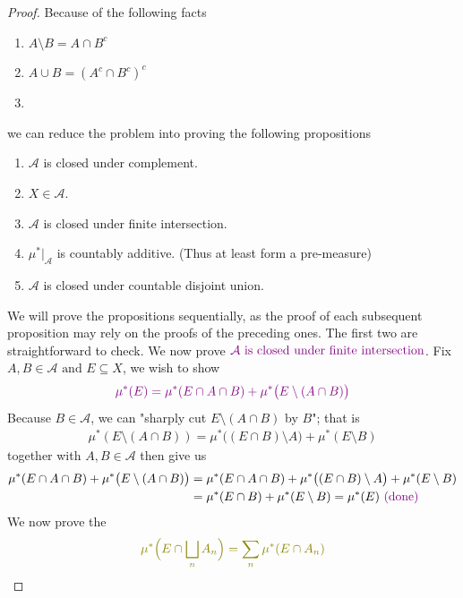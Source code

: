 \documentclass{report}
\begin{document}
\begin{proof}
Because of the following facts 
\begin{enumerate}[label=(\alph*)]
  \item $A\setminus B=A\cap B^c$
  \item $A\cup B=(A^c \cap B^c)^c$ 
  \item {}
\end{enumerate}
we can reduce the problem into proving the following propositions 
\begin{enumerate}[label=(\roman*)]
  \item $\mathcal{A}$ is closed under complement. 
  \item $X\in \mathcal{A}$.
  \item $\mathcal{A}$ is closed under finite intersection. 
  \item $\mu^*|_{\mathcal{A}}$ is countably additive. (Thus at least form a pre-measure)
  \item $\mathcal{A}$ is closed under countable disjoint union. 
\end{enumerate}
We will prove the propositions sequentially, as the proof of each subsequent proposition may rely on the proofs of the preceding ones. The first two are straightforward to check. We now prove $\textcolor{violet}{\mathcal{A}\text{ is closed under finite intersection}}$. Fix $A,B \in \mathcal{A}\text{ and }E\subseteq X$, we wish to show 
\begin{align*}
\textcolor{violet}{\mu^*(E)=\mu^*(E\cap A\cap B)+\mu^*\big(E\setminus (A\cap B)\big)}
\end{align*}
Because $B \in \mathcal{A}$, we can "sharply cut $E\setminus (A\cap B)$ by $B$"; that is 
 \begin{align}
\label{sharp}
\mu^*(E\setminus (A\cap B))=\mu^*\big((E\cap B)\setminus A\big)+\mu^*(E\setminus B)
\end{align}
 together with $A,B \in \mathcal{A}$ then give us 
\begin{align*}
\mu^*(E\cap A\cap B)+\mu^*\big(E\setminus (A\cap B)\big)&=\mu^*(E\cap A\cap B)+\mu^*\big((E\cap B)\setminus A \big)+ \mu^*(E\setminus B)\\
&=\mu^*(E\cap B)+\mu^*(E\setminus B)=\mu^*(E)\textcolor{violet}{\text{ (done) }}
\end{align*}
We now prove the  
\begin{align*}
\olive{\mu^*\Big(E\cap \bigsqcup_n A_n \Big)=\sum_n \mu^*(E\cap A_n)}

\end{align*}
\end{proof}
\end{document}
